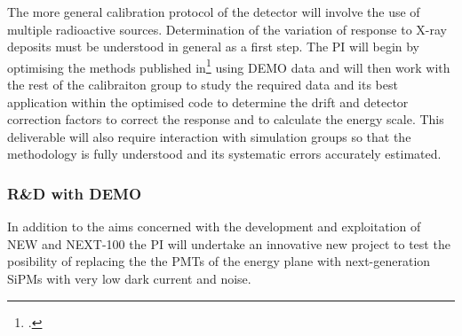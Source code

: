 \documentclass[a4paper,11pt,oneside]{article}
\begin{document}
The more general calibration protocol of the detector will involve the
use of multiple radioactive sources. Determination of the variation of
response to X-ray deposits must be understood in general as a first
step. The PI will begin by optimising the methods published
in\footcite{Lorca:2014sra} using DEMO data and will then work with the rest of the
calibraiton group to study the required data and its best application
within the optimised code to determine the drift and detector
correction factors to correct the response and to calculate the energy
scale. This deliverable will also require interaction with simulation
groups so that the methodology is fully understood and its systematic
errors accurately estimated.

\subsubsection*{R\&D with DEMO}
In addition to the aims concerned with the development and
exploitation of NEW and NEXT-100 the PI will undertake an innovative
new project to test the posibility of replacing the the PMTs of the
energy plane with next-generation SiPMs with very low dark current and
noise.
\end{document}
